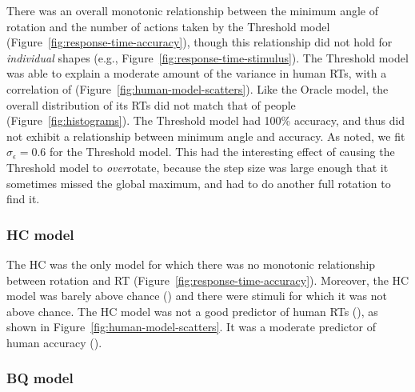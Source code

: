 \documentclass[10pt,letterpaper]{article}
\newcommand{\Oc}[0]{Oracle}
\newcommand{\Th}[0]{Threshold}
\newcommand{\Hc}[0]{HC}
\newcommand{\Bq}[0]{BQ}
\begin{document}
There was an overall monotonic relationship between the minimum angle
of rotation and the number of actions taken by the \Th{} model
(Figure~\ref{fig:response-time-accuracy}), though this relationship
did not hold for \textit{individual} shapes (e.g.,
Figure~\ref{fig:response-time-stimulus}).  The \Th{} model was able to
explain a moderate amount of the variance in human RTs, with a
correlation of \ThTimeCorr{}
(Figure~\ref{fig:human-model-scatters}). Like the \Oc{} model, the
overall distribution of its RTs did not match that of people
(Figure~\ref{fig:histograms}).  The \Th{} model had 100\% accuracy,
and thus did not exhibit a relationship between minimum angle and
accuracy.  As noted, we fit $\sigma_\epsilon=0.6$ for the \Th{}
model. This had the interesting effect of causing the \Th{} model to
\textit{over}rotate, because the step size was large enough that it
sometimes missed the global maximum, and had to do another full
rotation to find it.

\subsubsection{\Hc{} model}

The \Hc{} was the only model for which there was no monotonic
relationship between rotation and RT
(Figure~\ref{fig:response-time-accuracy}). Moreover, the \Hc{} model
was barely above chance (\HcAccuracy{}) and there were \HcNumChance{}
stimuli for which it was not above chance. The \Hc{} model was not a
good predictor of human RTs (\HcTimeCorr{}), as shown in
Figure~\ref{fig:human-model-scatters}. It was a moderate predictor of
human accuracy (\HcAccuracyCorr{}).

\subsubsection{\Bq{} model}
\end{document}
